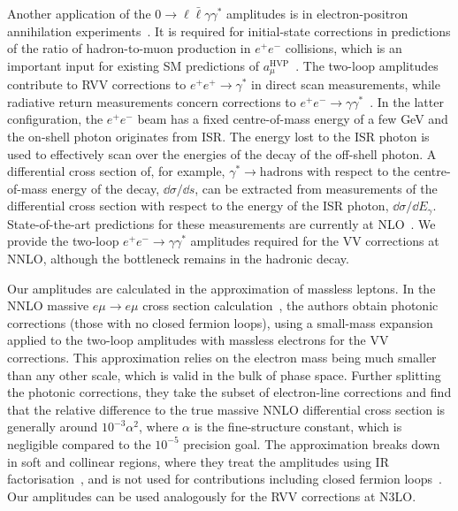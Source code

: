 \documentclass[main.tex]{subfiles}
\begin{document}
Another application of the $0\to \ell \bar\ell \gamma \gamma^*$ amplitudes is in electron-positron annihilation experiments~\cite{precisionsm}.
It is required for initial-state corrections in predictions of the ratio of hadron-to-muon production in $e^+e^-$ collisions, which is an important input for existing \ac{SM} predictions of $a^{\text{HVP}}_\mu$~\cite{Abbiendi:2022liz}.
The two-loop amplitudes contribute to \ac{RVV} corrections to $e^+e^+\to\gamma^*$ in direct scan measurements, while radiative return measurements concern corrections to $e^+e^-\to\gamma\gamma^*$~\cite{Aoyama:2020ynm}.
In the latter configuration, the $e^+e^-$ beam has a fixed centre-of-mass energy of a few GeV and the on-shell photon originates from \ac{ISR}.
The energy lost to the \ac{ISR} photon is used to effectively scan over the energies of the decay of the off-shell photon.
A differential cross section of, for example, $\gamma^*\to\text{hadrons}$ with respect to the centre-of-mass energy of the decay, $\dd\sigma/\dd s$, can be extracted from measurements of the differential cross section with respect to the energy of the \ac{ISR} photon, $\dd\sigma/\dd E_\gamma$.
State-of-the-art predictions for these measurements are currently at \ac{NLO}~\cite{Abbiendi:2022liz}.
We provide the two-loop $e^+e^-\to\gamma\gamma^*$ amplitudes required for the \ac{VV} corrections at \ac{NNLO}, although the bottleneck remains in the hadronic decay.

Our amplitudes are calculated in the approximation of massless leptons.
In the \ac{NNLO} massive $e\mu \to e\mu$ cross section calculation~\cite{Broggio:2022htr}, the authors obtain photonic corrections (those with no closed fermion loops), using a small-mass expansion~\cite{Penin:2005eh,Becher:2007cu,Engel:2018fsb} applied to the two-loop amplitudes with massless electrons for the \ac{VV} corrections.
This approximation relies on the electron mass being much smaller than any other scale, which is valid in the bulk of phase space.
Further splitting the photonic corrections, they take the subset of electron-line corrections and find that the relative difference to the true massive \ac{NNLO} differential cross section is generally around $10^{-3}\alpha^2$, where $\alpha$ is the fine-structure constant, which is negligible compared to the $10^{-5}$ precision goal.
The approximation breaks down in soft and collinear regions, where they treat the amplitudes using \ac{IR} factorisation~\cite{Banerjee:2021mty,Engel:2021ccn,Engel:2023ifn}, and is not used for contributions including closed fermion loops~\cite{Engel:2018fsb,Engel:2019nfw}.
Our amplitudes can be used analogously for the \ac{RVV} corrections at \ac{N3LO}.
\end{document}
